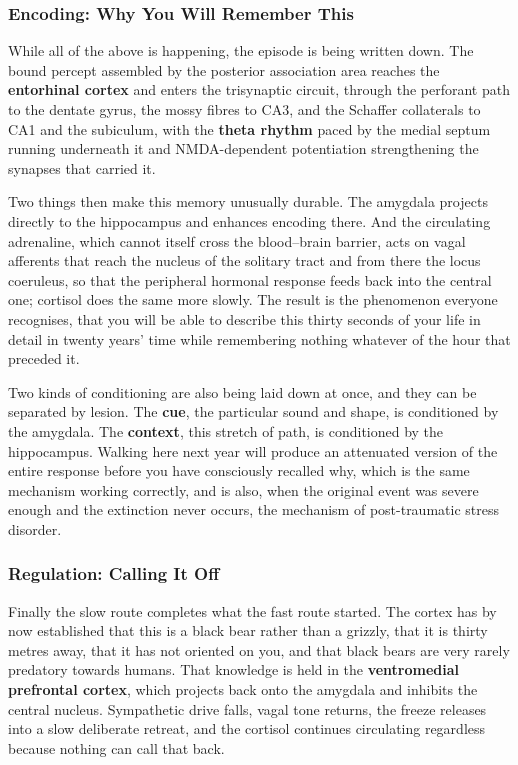\documentclass[11pt]{article}
\begin{document}
\subsubsection{Encoding: Why You Will Remember This}

While all of the above is happening, the episode is being written down. The bound percept assembled by the posterior association area reaches the \textbf{entorhinal cortex} and enters the trisynaptic circuit, through the perforant path to the dentate gyrus, the mossy fibres to CA3, and the Schaffer collaterals to CA1 and the subiculum, with the \textbf{theta rhythm} paced by the medial septum running underneath it and NMDA-dependent potentiation strengthening the synapses that carried it.

Two things then make this memory unusually durable. The amygdala projects directly to the hippocampus and enhances encoding there. And the circulating adrenaline, which cannot itself cross the blood--brain barrier, acts on vagal afferents that reach the nucleus of the solitary tract and from there the locus coeruleus, so that the peripheral hormonal response feeds back into the central one; cortisol does the same more slowly. The result is the phenomenon everyone recognises, that you will be able to describe this thirty seconds of your life in detail in twenty years' time while remembering nothing whatever of the hour that preceded it.

Two kinds of conditioning are also being laid down at once, and they can be separated by lesion. The \textbf{cue}, the particular sound and shape, is conditioned by the amygdala. The \textbf{context}, this stretch of path, is conditioned by the hippocampus. Walking here next year will produce an attenuated version of the entire response before you have consciously recalled why, which is the same mechanism working correctly, and is also, when the original event was severe enough and the extinction never occurs, the mechanism of post-traumatic stress disorder.

\subsubsection{Regulation: Calling It Off}

Finally the slow route completes what the fast route started. The cortex has by now established that this is a black bear rather than a grizzly, that it is thirty metres away, that it has not oriented on you, and that black bears are very rarely predatory towards humans. That knowledge is held in the \textbf{ventromedial prefrontal cortex}, which projects back onto the amygdala and inhibits the central nucleus. Sympathetic drive falls, vagal tone returns, the freeze releases into a slow deliberate retreat, and the cortisol continues circulating regardless because nothing can call that back.
\end{document}
